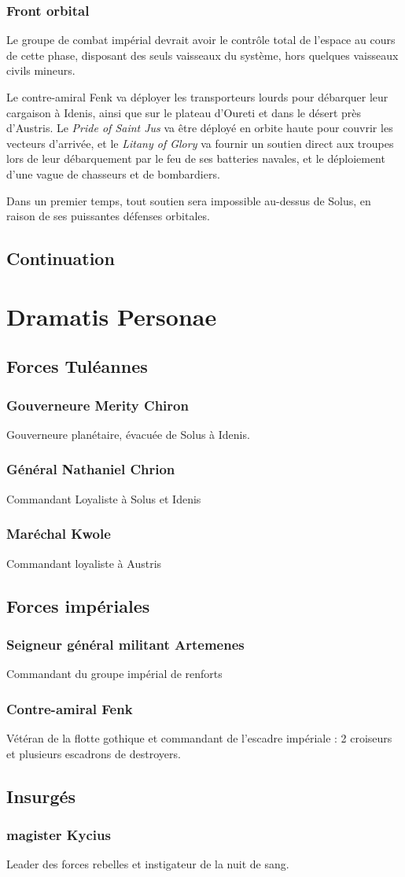 \documentclass[10pt,a4paper]{book}
\begin{document}
\subsection{Front orbital}
Le groupe de combat impérial devrait avoir le contrôle total de l'espace au cours de cette phase, disposant des seuls vaisseaux du système, hors quelques vaisseaux civils mineurs.

Le contre-amiral Fenk va déployer les transporteurs lourds pour débarquer leur cargaison à Idenis, ainsi que sur le plateau d'Oureti et dans le désert près d'Austris. Le \emph{Pride of Saint Jus} va être déployé en orbite haute pour couvrir les vecteurs d'arrivée, et le \emph{Litany of Glory } va fournir un soutien direct aux troupes lors de leur débarquement par le feu de ses batteries navales, et le déploiement d'une vague de chasseurs et de bombardiers.

Dans un premier temps, tout soutien sera impossible au-dessus de Solus, en raison de ses puissantes défenses orbitales.
\section{Continuation}


\chapter{Dramatis Personae}
\section{Forces Tuléannes}
\subsection{Gouverneure Merity Chiron}
Gouverneure planétaire, évacuée de Solus à Idenis.
\subsection{Général Nathaniel Chrion}
Commandant Loyaliste à Solus et Idenis
\subsection{Maréchal Kwole}
Commandant loyaliste à Austris
\section{Forces impériales}
\subsection{Seigneur général militant Artemenes}
Commandant du groupe impérial de renforts
\subsection{Contre-amiral Fenk}
Vétéran de la flotte gothique et commandant de l'escadre impériale : 2 croiseurs et plusieurs escadrons de destroyers.
\section{Insurgés}
\subsection{magister Kycius}
Leader des forces rebelles et instigateur de la nuit de sang.
\end{document}
